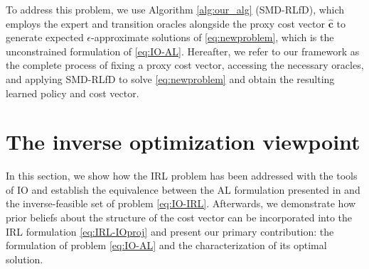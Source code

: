 \documentclass[10pt]{article} %
\def\vc{{\bm{c}}}
\begin{document}
To address this problem, we use Algorithm \ref{alg:our_alg} (SMD-RLfD), which employs the expert and transition oracles alongside the proxy cost vector $\hat{\vc}$ to generate expected $\epsilon$-approximate solutions of \eqref{eq:newproblem}, which is the unconstrained formulation of \eqref{eq:IO-AL}. Hereafter, we refer to our framework as the complete process of fixing a proxy cost vector, accessing the necessary oracles, and applying SMD-RLfD to solve \eqref{eq:newproblem} and obtain the resulting learned policy and cost vector.

\section{The inverse optimization viewpoint}
In this section, we show how the IRL problem has been addressed with the tools of IO and establish the equivalence between the AL  formulation presented in \citet{Kamoutsi2021} and the inverse-feasible set of problem \eqref{eq:IO-IRL}. Afterwards, we demonstrate how prior beliefs about the structure of the cost vector can be incorporated into the IRL formulation \eqref{eq:IRL-IOproj} and present our primary contribution: the formulation of problem \eqref{eq:IO-AL} and the characterization of its optimal solution.
\end{document}
